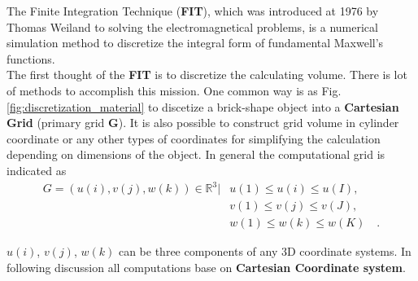 The Finite Integration Technique (\textbf{FIT}), which was introduced at 1976 by Thomas Weiland\cite{FIT_discrete_method} to solving the electromagnetical problems, is a numerical simulation method to discretize the integral form of fundamental Maxwell's functions.\\

The first thought of the \textbf{FIT} is to discretize the calculating volume. There is lot of methods to accomplish this mission. One common way is as Fig. \ref{fig:discretization_material} to discetize a brick-shape object into a \textbf{Cartesian Grid} (primary grid \textbf{G}). It is also possible to construct grid volume in cylinder coordinate or any other types of  coordinates\cite{FIT_triangular_discretization,FDTD_nonorthogonal_grids} for simplifying the calculation depending on dimensions of the object. In general  the computational grid is indicated as \\
\begin{align}
G=
(u(i), v(j), w(k))\in \mathbb{R}^3|&u(1)\leq u(i)\leq u(I),\nonumber\\
													 &v(1)\leq v(j)\leq v(J),\nonumber\\ 
													 &w(1)\leq w(k)\leq w(K)\quad \text{.}
\label{eq:grid}
\end{align}

$u(i)$, $v(j)$, $w(k)$ can be three components of any 3D coordinate systems. In following discussion all computations base on \textbf{Cartesian Coordinate system}.\\

